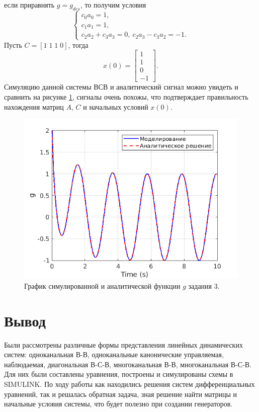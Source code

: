 если приравнять $g=g_{des}$, то получим условия
\begin{equation*}
    \begin{cases}
        c_0a_0=1,\\
        c_1a_1=1,\\
        c_2a_2+c_3a_3=0,\
        c_2a_3-c_3a_2=-1.
    \end{cases}
\end{equation*}
Пусть $C=[1\; 1\; 1\; 0]$, тогда
\begin{equation*}
    x(0)=\begin{bmatrix}
        1\\1\\0\\-1
    \end{bmatrix}.
\end{equation*}
Симуляцию данной системы ВСВ и аналитический сигнал можно увидеть и сравнить
на рисунке \ref{fig:task_3_out}, сигналы очень похожы, что подтверждает
правильность нахождения матриц $A$, $C$ и начальных условий $x(0)$.

\begin{figure}
    \centering
    \includegraphics[width=1\textwidth]{figs/task_3_out.png}
    \caption{График симулированной и аналитической функции $g$ задания 3.}
    \label{fig:task_3_out}
\end{figure}




\section{Вывод}

Были рассмотрены различные формы представления линейных динамических
систем: одноканальная В-В, одноканальные канонические управляемая, наблюдаемая,
диагональная В-С-В, многоканальная В-В, многоканальная В-С-В. Для них были составлены
уравнения, построены и симулированы схемы в SIMULINK. По ходу работы как находились
решения систем дифференциальных уравнений, так и решалась обратная задача, зная 
решение найти матрицы и начальные условия системы, что будет полезно
при создании генераторов.


\newpage



